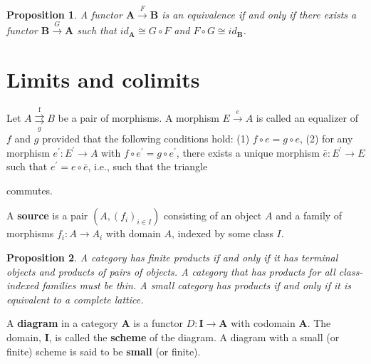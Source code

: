 \documentclass{book}
\newtheorem{prop}{Proposition}
\begin{document}
\begin{prop}
    A functor $\mathbf{A} \xrightarrow{F} \mathbf{B}$ is an equivalence if and only if there exists a functor $\mathbf{B} \xrightarrow{G} \mathbf{A}$ such that $i d_{\mathbf{A}} \cong G \circ F$ and $F \circ G \cong i d_{\mathbf{B}}$.
\end{prop}


\section{Limits and colimits}
Let $A \stackrel{\text { f }}{\underset{g}{\rightrightarrows}} B$ be a pair of morphisms. A morphism $E \xrightarrow{e} A$ is called an equalizer of $f$ and $g$ provided that the following conditions hold:
(1) $f \circ e=g \circ e$,
(2) for any morphism $e^{\prime}: E^{\prime} \rightarrow A$ with $f \circ e^{\prime}=g \circ e^{\prime}$, there exists a unique morphism $\bar{e}: E^{\prime} \rightarrow E$ such that $e^{\prime}=e \circ \bar{e}$, i.e., such that the triangle
 commutes.
    

A \textbf{source} is a pair $\left(A,\left(f_i\right)_{i \in I}\right)$ consisting of an object $A$ and a family of morphisms $f_i: A \rightarrow A_i$ with domain $A$, indexed by some class $I$.


\begin{prop}
    A category has finite products if and only if it has terminal objects and products of pairs of objects.
    A category that has products for all class-indexed families must be thin.
A small category has products if and only if it is equivalent to a complete lattice.
\end{prop}

A \textbf{diagram} in a category $\mathbf{A}$ is a functor $D: \mathbf{I} \rightarrow \mathbf{A}$ with codomain $\mathbf{A}$. The domain, $\mathbf{I}$, is called the \textbf{scheme} of the diagram. A diagram with a small (or finite) scheme is said to be \textbf{small} (or finite).
\end{document}
